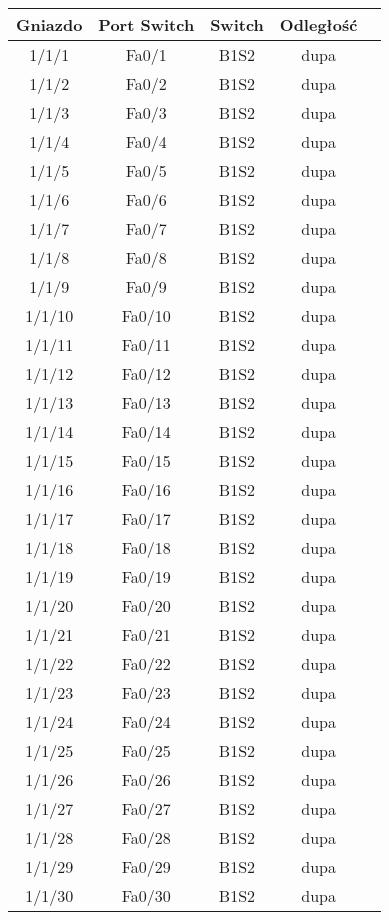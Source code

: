 \begin{center}
    \begin{longtable}{|c|c|c|c|c|}
    \hline
    Gniazdo & Port Switch & Switch & Odległość \\ \hline
	1/1/1 & Fa0/1 & B1S2 & dupa \\ \hline
	1/1/2 & Fa0/2 & B1S2 & dupa \\ \hline
	1/1/3 & Fa0/3 & B1S2 & dupa \\ \hline
	1/1/4 & Fa0/4 & B1S2 & dupa \\ \hline
	1/1/5 & Fa0/5 & B1S2 & dupa \\ \hline
	1/1/6 & Fa0/6 & B1S2 & dupa \\ \hline
	1/1/7 & Fa0/7 & B1S2 & dupa \\ \hline
	1/1/8 & Fa0/8 & B1S2 & dupa \\ \hline
	1/1/9 & Fa0/9 & B1S2 & dupa \\ \hline
	1/1/10 & Fa0/10 & B1S2 & dupa \\ \hline
	1/1/11 & Fa0/11 & B1S2 & dupa \\ \hline
	1/1/12 & Fa0/12 & B1S2 & dupa \\ \hline
	1/1/13 & Fa0/13 & B1S2 & dupa \\ \hline
	1/1/14 & Fa0/14 & B1S2 & dupa \\ \hline
	1/1/15 & Fa0/15 & B1S2 & dupa \\ \hline
	1/1/16 & Fa0/16 & B1S2 & dupa \\ \hline
	1/1/17 & Fa0/17 & B1S2 & dupa \\ \hline
	1/1/18 & Fa0/18 & B1S2 & dupa \\ \hline
	1/1/19 & Fa0/19 & B1S2 & dupa \\ \hline
	1/1/20 & Fa0/20 & B1S2 & dupa \\ \hline
	1/1/21 & Fa0/21 & B1S2 & dupa \\ \hline
	1/1/22 & Fa0/22 & B1S2 & dupa \\ \hline
	1/1/23 & Fa0/23 & B1S2 & dupa \\ \hline
	1/1/24 & Fa0/24 & B1S2 & dupa \\ \hline
	1/1/25 & Fa0/25 & B1S2 & dupa \\ \hline
	1/1/26 & Fa0/26 & B1S2 & dupa \\ \hline
	1/1/27 & Fa0/27 & B1S2 & dupa \\ \hline
	1/1/28 & Fa0/28 & B1S2 & dupa \\ \hline
	1/1/29 & Fa0/29 & B1S2 & dupa \\ \hline
	1/1/30 & Fa0/30 & B1S2 & dupa \\ \hline

\end{longtable}
\end{center}
